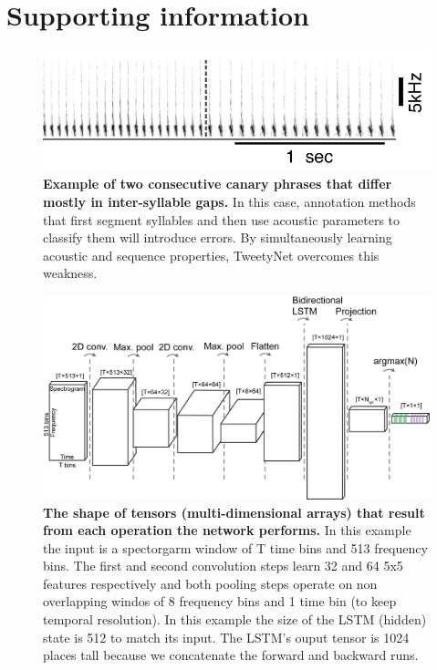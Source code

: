 \documentclass[10pt,letterpaper]{article}
\newcommand{\beginsupplement}{%
        \setcounter{table}{0}
        \renewcommand{\thetable}{S\arabic{table}}%
        \setcounter{figure}{0}
        \renewcommand{\thefigure}{S\arabic{figure}}%
     }
\begin{document}
\section*{Supporting information}
\beginsupplement
\begin{figure}[!ht]
\includegraphics[scale=1.0]{Figures/Supplementaries/Supp_Figure1_1.png}
\caption{{\bf Example of two consecutive canary phrases that differ mostly in inter-syllable gaps.} In this case, annotation methods that first segment syllables and then use acoustic parameters to classify them will introduce errors. By simultaneously learning acoustic and sequence properties, TweetyNet overcomes this weakness.}
\label{suppfig_canary_phrases_diff_gaps}
\end{figure}

\begin{figure}[!ht]
\includegraphics[scale=0.75]{Figures/Supplementaries/suppfig_tweetynet_tensor_shapes_example.png}
\caption{{\bf The shape of tensors (multi-dimensional arrays) that result from each operation the network performs.} In this example the input is a spectorgarm window of T time bins and 513 frequency bins. The first and second convolution steps learn 32 and 64 5x5 features respectively and both pooling steps operate on non overlapping windos of 8 frequency bins and 1 time bin (to keep temporal resolution). In this example the size of the LSTM (hidden) state is 512 to match its input. The LSTM's ouput tensor is 1024 places tall because we concatenate the forward and backward runs.}
\label{suppfig_example_tensors}
\end{figure}
\end{document}

